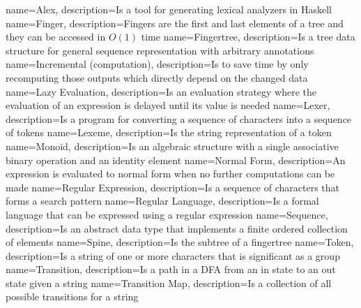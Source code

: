 
{
        name=Alex,
        description={Is a tool for generating lexical analyzers in Haskell}
}
{
        name=Finger,
        description={Fingers are the first and last elements of a tree and they
            can be accessed in $O(1)$ time}
}
{
        name=Fingertree,
            description={Is a tree data structure for general
            sequence representation with arbitrary annotations}
}
{
        name=Incremental (computation),
            description={Is to save time by only recomputing those outputs which
            directly depend on the changed data}
}
{
        name=Lazy Evaluation,
            description={Is an evaluation strategy where the evaluation of an
            expression is delayed until its value is needed}
}
{
        name=Lexer,
            description={Is a program for converting a sequence of characters
            into a sequence of tokens}
}
{
        name=Lexeme,
            description={Is the string representation of a token}
}
{
        name=Monoid,
            description={Is an algebraic structure with a single associative
            binary operation and an identity element}
}
{
        name=Normal Form,
            description={An expression is evaluated to normal form when no further
            computations can be made}
}
{
        name=Regular Expression,
            description={Is a sequence of characters that forms a search
            pattern}
}
{
        name=Regular Language,
            description={Is a formal language that can be expressed using a
            regular expression}
}
{
        name=Sequence,
            description={Is an abstract data type that implements a finite
            ordered collection of elements}
}
{
        name=Spine,
            description={Is the subtree of a fingertree}
}
{
        name=Token,
            description={Is a string of one or more characters that is
            significant as a group}
}
{
        name=Transition,
            description={Is a path in a DFA from an in state to an out state
            given a string}
}
{
        name=Transition Map,
            description={Is a collection of all possible transitions for a
            string}
}
